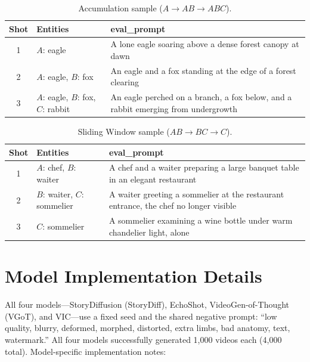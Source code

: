 \documentclass[sigconf,review,anonymous]{acmart}
\begin{document}
\begin{table}[H]
\caption{Accumulation sample ($A \to AB \to ABC$).}
\label{tab:sample_accum}
\centering
\small
\setlength{\tabcolsep}{3pt}
\begin{tabular}{@{}clp{5.2cm}@{}}
\toprule
Shot & Entities & eval\_prompt \\
\midrule
1 & $A$: eagle & A lone eagle soaring above a dense forest canopy at dawn \\
2 & $A$: eagle, $B$: fox & An eagle and a fox standing at the edge of a forest clearing \\
3 & $A$: eagle, $B$: fox, $C$: rabbit & An eagle perched on a branch, a fox below, and a rabbit emerging from undergrowth \\
\bottomrule
\end{tabular}
\end{table}

\begin{table}[H]
\caption{Sliding Window sample ($AB \to BC \to C$).}
\label{tab:sample_slidwin}
\centering
\small
\setlength{\tabcolsep}{3pt}
\begin{tabular}{@{}clp{5.2cm}@{}}
\toprule
Shot & Entities & eval\_prompt \\
\midrule
1 & $A$: chef, $B$: waiter & A chef and a waiter preparing a large banquet table in an elegant restaurant \\
2 & $B$: waiter, $C$: sommelier & A waiter greeting a sommelier at the restaurant entrance, the chef no longer visible \\
3 & $C$: sommelier & A sommelier examining a wine bottle under warm chandelier light, alone \\
\bottomrule
\end{tabular}
\end{table}


\section{Model Implementation Details}
\label{app:models}

All four models---StoryDiffusion (StoryDiff), EchoShot, VideoGen-of-Thought (VGoT), and VIC---use a fixed seed and the shared negative prompt: ``low quality, blurry, deformed, morphed, distorted, extra limbs, bad anatomy, text, watermark.'' All four models successfully generated 1,000 videos each (4,000 total). Model-specific implementation notes:
\end{document}
